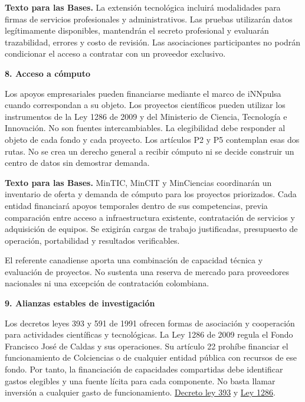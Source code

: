 \textbf{Texto para las Bases.} La extensión tecnológica incluirá modalidades para firmas de servicios profesionales y administrativos. Las pruebas utilizarán datos legítimamente disponibles, mantendrán el secreto profesional y evaluarán trazabilidad, errores y costo de revisión. Las asociaciones participantes no podrán condicionar el acceso a contratar con un proveedor exclusivo.

\textbf{8. Acceso a cómputo}\par\nobreak

Los apoyos empresariales pueden financiarse mediante el marco de iNNpulsa cuando correspondan a su objeto. Los proyectos científicos pueden utilizar los instrumentos de la Ley 1286 de 2009 y del Ministerio de Ciencia, Tecnología e Innovación. No son fuentes intercambiables. La elegibilidad debe responder al objeto de cada fondo y cada proyecto. Los artículos P2 y P5 contemplan esas dos rutas. No se crea un derecho general a recibir cómputo ni se decide construir un centro de datos sin demostrar demanda.

\textbf{Texto para las Bases.} MinTIC, MinCIT y MinCiencias coordinarán un inventario de oferta y demanda de cómputo para los proyectos priorizados. Cada entidad financiará apoyos temporales dentro de sus competencias, previa comparación entre acceso a infraestructura existente, contratación de servicios y adquisición de equipos. Se exigirán cargas de trabajo justificadas, presupuesto de operación, portabilidad y resultados verificables.

El referente canadiense aporta una combinación de capacidad técnica y evaluación de proyectos. No sustenta una reserva de mercado para proveedores nacionales ni una excepción de contratación colombiana.

\textbf{9. Alianzas estables de investigación}\par\nobreak

Los decretos leyes 393 y 591 de 1991 ofrecen formas de asociación y cooperación para actividades científicas y tecnológicas. La Ley 1286 de 2009 regula el Fondo Francisco José de Caldas y sus operaciones. Su artículo 22 prohíbe financiar el funcionamiento de Colciencias o de cualquier entidad pública con recursos de ese fondo. Por tanto, la financiación de capacidades compartidas debe identificar gastos elegibles y una fuente lícita para cada componente. No basta llamar inversión a cualquier gasto de funcionamiento. \href{https://www.funcionpublica.gov.co/eva/gestornormativo/norma.php?i=67131}{Decreto ley 393} y \href{https://normativa.colpensiones.gov.co/compilacion/docs/ley\_1286\_2009.htm}{Ley 1286}.

